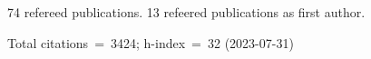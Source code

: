 74 refereed publications. 13 refeered publications as first author.

Total citations~=~3424; h-index~=~32 (2023-07-31)